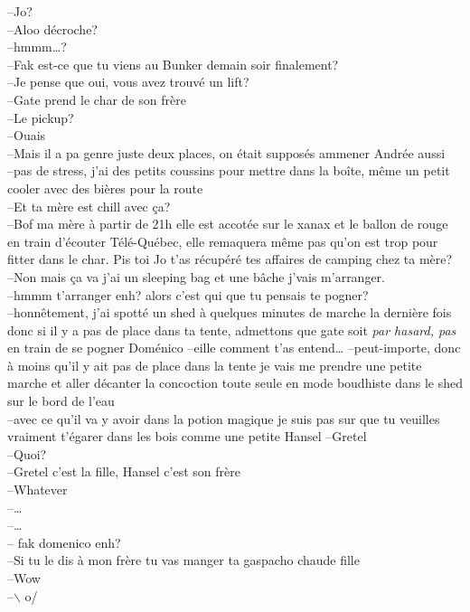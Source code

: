 --Jo?\\
--Aloo décroche?\\
--hmmm\ldots?\\
--Fak est-ce que tu viens au Bunker demain soir finalement?\\
--Je pense que oui, vous avez trouvé un lift?\\
--Gate prend le char de son frère\\
--Le pickup?\\
--Ouais\\
--Mais il a pa genre juste deux places, on était supposés ammener
Andrée aussi\\
--pas de stress, j'ai des petits coussins pour mettre dans la boîte, même
un petit cooler avec des bières pour la route\\
--Et ta mère est chill avec ça?\\
--Bof ma mère à partir de 21h elle est accotée sur le xanax et le ballon de
  rouge en train d'écouter Télé-Québec, elle remaquera même pas qu'on est
trop pour fitter dans le char. Pis toi Jo t'as récupéré tes affaires de camping
chez ta mère?\\
--Non mais ça va j'ai un sleeping bag et une bâche j'vais m'arranger.\\
--hmmm t'arranger enh? alors c'est qui que tu pensais te pogner?\\
--honnêtement, j'ai spotté un shed à quelques minutes de marche
la dernière fois donc si il y a pas de place dans ta tente, 
admettons que gate soit \textit{par hasard, pas} en train 
de se pogner Doménico 
--eille comment t'as entend\ldots
--peut-importe, donc à moins qu'il y ait pas de place dans la tente
je vais me prendre une petite marche et aller décanter la concoction
toute seule en mode boudhiste dans le shed sur le bord de l'eau\\
--avec ce qu'il va y avoir dans la potion magique je suis pas sur 
que tu veuilles vraiment t'égarer dans les bois comme une petite
Hansel
--Gretel\\
--Quoi?\\
--Gretel c'est la fille, Hansel c'est son frère\\
--Whatever\\
--\ldots\\
--\ldots\\
-- fak domenico enh?\\
--Si tu le dis à mon frère tu vas manger ta gaspacho chaude fille\\
--Wow\\
--$\backslash$  o/
\clearpage
